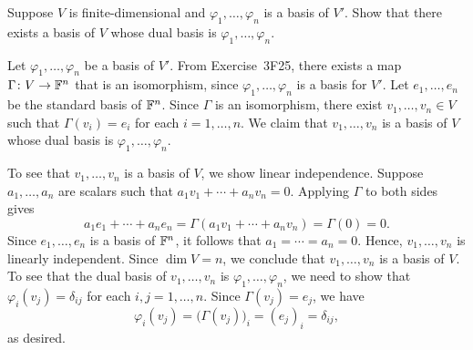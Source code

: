 \begin{exercise}
Suppose $V$ is finite-dimensional and $\varphi_1,\dots,\varphi_n$ is a basis of
$V'$. Show that there exists a basis of $V$ whose dual basis is
$\varphi_1,\dots,\varphi_n$.
\end{exercise}
\begin{solution}
Let $\varphi_1,\dots,\varphi_n$ be a basis of $V'$. From Exercise~3F25, there
exists a map $\Gamma\colon V\to\mathbb{F}^n$ that is an isomorphism, since
$\varphi_1,\dots,\varphi_n$ is a basis for $V'$. Let $e_1,\dots,e_n$ be the
standard basis of $\mathbb{F}^n$. Since $\Gamma$ is an isomorphism, there exist
$v_1,\dots,v_n\in V$ such that $\Gamma(v_i)=e_i$ for each $i=1,\dots,n$. We
claim that $v_1,\dots,v_n$ is a basis of $V$ whose dual basis is
$\varphi_1,\dots,\varphi_n$.

To see that $v_1,\dots,v_n$ is a basis of $V$, we show linear independence.
Suppose $a_1,\dots,a_n$ are scalars such that $a_1v_1+\cdots+a_nv_n=0$.
Applying $\Gamma$ to both sides gives
\[ a_1e_1+\cdots+a_ne_n = \Gamma(a_1v_1+\cdots+a_nv_n) = \Gamma(0) = 0. \]
Since $e_1,\dots,e_n$ is a basis of $\mathbb{F}^n$, it follows that
$a_1=\cdots=a_n=0$. Hence, $v_1,\dots,v_n$ is linearly independent. Since
$\dim V=n$, we conclude that $v_1,\dots,v_n$ is a basis of $V$. To see that the
dual basis of $v_1,\dots,v_n$ is $\varphi_1,\dots,\varphi_n$, we need to show
that $\varphi_i(v_j)=\delta_{ij}$ for each $i,j=1,\dots,n$. Since
$\Gamma(v_j)=e_j$, we have
\[ \varphi_i(v_j) = \bigl(\Gamma(v_j)\bigr)_i = (e_j)_i = \delta_{ij}, \]
as desired.
\end{solution}

